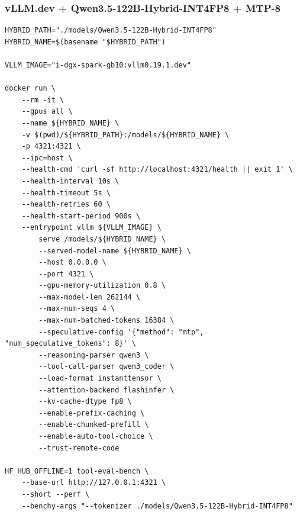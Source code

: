 \documentclass{article}
\begin{document}
\subsubsection{vLLM.dev + Qwen3.5-122B-Hybrid-INT4FP8 + MTP-8}
\begin{lstlisting}
HYBRID_PATH="./models/Qwen3.5-122B-Hybrid-INT4FP8"
HYBRID_NAME=$(basename "$HYBRID_PATH")

VLLM_IMAGE="i-dgx-spark-gb10:vllm0.19.1.dev"

docker run \
    --rm -it \
    --gpus all \
    --name ${HYBRID_NAME} \
    -v $(pwd)/${HYBRID_PATH}:/models/${HYBRID_NAME} \
    -p 4321:4321 \
    --ipc=host \
    --health-cmd 'curl -sf http://localhost:4321/health || exit 1' \
    --health-interval 10s \
    --health-timeout 5s \
    --health-retries 60 \
    --health-start-period 900s \
    --entrypoint vllm ${VLLM_IMAGE} \
        serve /models/${HYBRID_NAME} \
        --served-model-name ${HYBRID_NAME} \
        --host 0.0.0.0 \
        --port 4321 \
        --gpu-memory-utilization 0.8 \
        --max-model-len 262144 \
        --max-num-seqs 4 \
        --max-num-batched-tokens 16384 \
        --speculative-config '{"method": "mtp", "num_speculative_tokens": 8}' \
        --reasoning-parser qwen3 \
        --tool-call-parser qwen3_coder \
        --load-format instanttensor \
        --attention-backend flashinfer \
        --kv-cache-dtype fp8 \
        --enable-prefix-caching \
        --enable-chunked-prefill \
        --enable-auto-tool-choice \
        --trust-remote-code

HF_HUB_OFFLINE=1 tool-eval-bench \
    --base-url http://127.0.0.1:4321 \
    --short --perf \
    --benchy-args "--tokenizer ./models/Qwen3.5-122B-Hybrid-INT4FP8"
\end{lstlisting}
\end{document}
